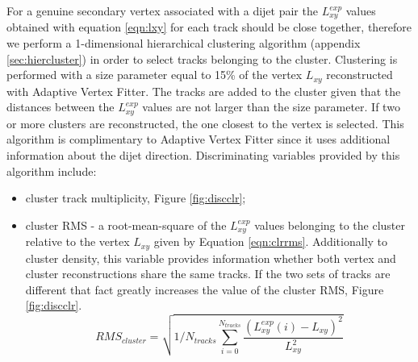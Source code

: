 \begin{enumerate}
For a genuine secondary vertex associated with a dijet pair the $L_{xy}^{exp}$ values obtained with equation
\ref{eqn:lxy} for each track should be close
 together, therefore we perform a 1-dimensional hierarchical clustering algorithm (appendix \ref{sec:hiercluster})
in order to select tracks belonging to the cluster. 
Clustering is performed with a size parameter equal to 15\% of 
the vertex $L_{xy}$ reconstructed with Adaptive Vertex Fitter. 
The tracks are added to the cluster given that the distances between the $L_{xy}^{exp}$
values are not larger than the size parameter. 
 If two or more clusters 
are reconstructed, the one closest to the vertex is selected. 
This algorithm is complimentary to Adaptive Vertex Fitter
since it uses additional information about the dijet direction. Discriminating variables provided
 by this algorithm include:
\begin{itemize}
\item cluster track multiplicity, Figure \ref{fig:discclr};
\item cluster RMS - a root-mean-square of the $L_{xy}^{exp}$ values belonging to the cluster
 relative to the vertex $L_{xy}$ given by Equation \ref{eqn:clrrms}. Additionally to cluster density, this
variable provides information whether both vertex and cluster reconstructions share the same tracks.
 If the two sets of tracks
are different that fact greatly increases the value of the cluster RMS, Figure \ref{fig:discclr}.
\begin{equation}
RMS_{cluster} = \sqrt{1/N_{tracks}\sum_{i=0}^{N_{tracks}}\frac{ (L_{xy}^{exp}(i) - L_{xy})^2}{L_{xy}^2}}
\label{eqn:clrrms}
\end{equation}
\end{itemize}


\end{enumerate}
